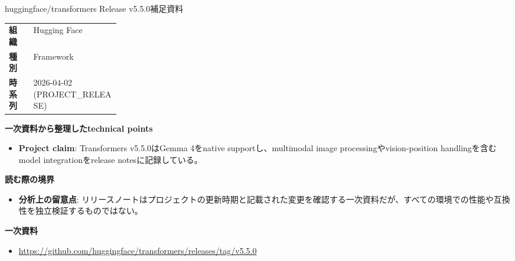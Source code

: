 \begin{technicalnote}{huggingface/transformers Release v5.5.0}{補足資料}
\begingroup
\begin{tabularx}{\linewidth}{@{}>{\bfseries}p{0.22\linewidth}X@{}}
組織 & Hugging Face \\
種別 & Framework \\
時系列 & 2026-04-02 (PROJECT\_RELEASE) \\
\end{tabularx}
\smallskip
{\bfseries 一次資料から整理したtechnical points}
\begin{itemize}[leftmargin=1.5em,itemsep=0.35em]
\item \textbf{Project claim}: Transformers v5.5.0はGemma 4をnative supportし、multimodal image processingやvision-position handlingを含むmodel integrationをrelease notesに記録している。
\end{itemize}
{\bfseries 読む際の境界}
\begin{itemize}[leftmargin=1.5em,itemsep=0.35em]
\item \textbf{分析上の留意点}: リリースノートはプロジェクトの更新時期と記載された変更を確認する一次資料だが、すべての環境での性能や互換性を独立検証するものではない。
\end{itemize}
\begin{samepage}
{\bfseries 一次資料}
\begingroup\sloppy
\begin{itemize}[leftmargin=1.5em,itemsep=0.25em]
\item {\scriptsize\url{https://github.com/huggingface/transformers/releases/tag/v5.5.0}}
\end{itemize}
\endgroup
\end{samepage}
\endgroup
\end{technicalnote}
\medskip
